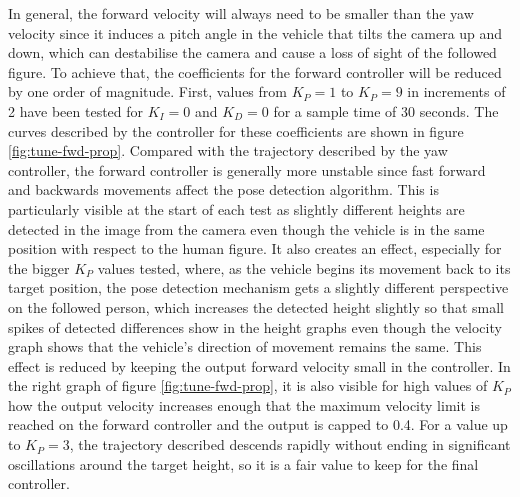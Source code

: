 In general, the forward velocity will always need to be smaller than the yaw velocity since it induces a pitch angle in the vehicle that tilts the camera up and down, which can destabilise the camera and cause a loss of sight of the followed figure.
To achieve that, the coefficients for the forward controller will be reduced by one order of magnitude.
First, values from $K_P=1$ to $K_P=9$ in increments of 2 have been tested for $K_I=0$ and $K_D=0$ for a sample time of 30 seconds.
The curves described by the controller for these coefficients are shown in figure \ref{fig:tune-fwd-prop}.
Compared with the trajectory described by the yaw controller, the forward controller is generally more unstable since fast forward and backwards movements affect the pose detection algorithm.
This is particularly visible at the start of each test as slightly different heights are detected in the image from the camera even though the vehicle is in the same position with respect to the human figure.
It also creates an effect, especially for the bigger $K_P$ values tested, where, as the vehicle begins its movement back to its target position, the pose detection mechanism gets a slightly different perspective on the followed person, which increases the detected height slightly so that small spikes of detected differences show in the height graphs even though the velocity graph shows that the vehicle's direction of movement remains the same.
This effect is reduced by keeping the output forward velocity small in the controller.
In the right graph of figure \ref{fig:tune-fwd-prop}, it is also visible for high values of $K_P$ how the output velocity increases enough that the maximum velocity limit is reached on the forward controller and the output is capped to 0.4.
For a value up to $K_P=3$, the trajectory described descends rapidly without ending in significant oscillations around the target height, so it is a fair value to keep for the final controller.


